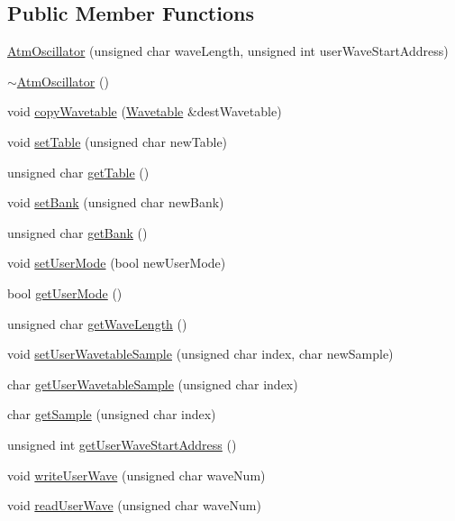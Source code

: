 \subsection*{Public Member Functions}
\begin{DoxyCompactItemize}
\item 
\hyperlink{class_atm_oscillator_a864b35c83864a6d5045f9dbb42fa862e}{Atm\+Oscillator} (unsigned char wave\+Length, unsigned int user\+Wave\+Start\+Address)
\item 
\hyperlink{class_atm_oscillator_a3d5b959eff3a2cb4fa3200cadeb2ab0b}{$\sim$\+Atm\+Oscillator} ()
\item 
void \hyperlink{class_atm_oscillator_ab0b1ab90e227ced30ddffff96bec6427}{copy\+Wavetable} (\hyperlink{class_wavetable}{Wavetable} \&dest\+Wavetable)
\item 
void \hyperlink{class_atm_oscillator_ac4248a3cd6fceea6ee677e74faba4af0}{set\+Table} (unsigned char new\+Table)
\item 
unsigned char \hyperlink{class_atm_oscillator_a01e9856e38a1e83b5d83fd503d5ad80e}{get\+Table} ()
\item 
void \hyperlink{class_atm_oscillator_a9f65ae9f2132c46f73b776a869b5bf21}{set\+Bank} (unsigned char new\+Bank)
\item 
unsigned char \hyperlink{class_atm_oscillator_a56b407e4175f4625e2e0d7a6f87c2225}{get\+Bank} ()
\item 
void \hyperlink{class_atm_oscillator_aafaccbb54d52f2c0eb07eb968498eef4}{set\+User\+Mode} (bool new\+User\+Mode)
\item 
bool \hyperlink{class_atm_oscillator_a21a4425606aa28eabf47a28ea7f02c9a}{get\+User\+Mode} ()
\item 
unsigned char \hyperlink{class_atm_oscillator_ad846116dfd6f232cae79ada35dddadfd}{get\+Wave\+Length} ()
\item 
void \hyperlink{class_atm_oscillator_aa62dba14693f65adcb3daa7aa4757ba1}{set\+User\+Wavetable\+Sample} (unsigned char index, char new\+Sample)
\item 
char \hyperlink{class_atm_oscillator_ae5ef1556ef77dbf9ecceb5b64a1ad7e8}{get\+User\+Wavetable\+Sample} (unsigned char index)
\item 
char \hyperlink{class_atm_oscillator_aa6fe7de8b2d573159271a47f5c8686e1}{get\+Sample} (unsigned char index)
\item 
unsigned int \hyperlink{class_atm_oscillator_a19bdaa400d57eeb24ca027febc2fd1cf}{get\+User\+Wave\+Start\+Address} ()
\item 
void \hyperlink{class_atm_oscillator_a92133ff9c3b34a6acb703f0d6d95cd71}{write\+User\+Wave} (unsigned char wave\+Num)
\item 
void \hyperlink{class_atm_oscillator_a08b383cd2305c232de827399aa8d2ccb}{read\+User\+Wave} (unsigned char wave\+Num)
\end{DoxyCompactItemize}


